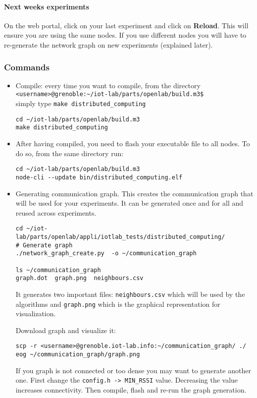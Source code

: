 \documentclass{article}
\begin{document}
\paragraph{Next weeks experiments} On the web portal, click on your last
experiment and click on \textbf{Reload}. This will ensure you are using the
same nodes. If you use different nodes you will have to re-generate the network
graph on new experiments (explained later).

\subsubsection{Commands}

\begin{itemize}

\item Compile: every time you want to compile, from the directory\\
    \verb=<username>@grenoble:~/iot-lab/parts/openlab/build.m3$=\\
    simply type \verb=make distributed_computing=

    \begin{verbatim}cd ~/iot-lab/parts/openlab/build.m3
make distributed_computing\end{verbatim}

\item After having compiled, you need to flash your executable file to all nodes.
    To do so, from the same directory run:
    \begin{verbatim}cd ~/iot-lab/parts/openlab/build.m3
node-cli --update bin/distributed_computing.elf\end{verbatim}

\item Generating communication graph. This creates the communication graph that
    will be used for your experiments. It can be generated once and for all and
    reused across experiments.

    \begin{verbatim}cd ~/iot-lab/parts/openlab/appli/iotlab_tests/distributed_computing/
# Generate graph
./network_graph_create.py  -o ~/communication_graph

ls ~/communication_graph
graph.dot  graph.png  neighbours.csv \end{verbatim}

It generates two important files:
\texttt{neighbours.csv} which will be used by the algorithms and
\texttt{graph.png} which is the graphical representation for visualization.

Download graph and visualize it:
\begin{verbatim}scp -r <username>@grenoble.iot-lab.info:~/communication_graph/ ./
eog ~/communication_graph/graph.png\end{verbatim}

If you graph is not connected or too dense you may want to generate another one.
First change the \verb=config.h -> MIN_RSSI= value. Decreasing the value
increases connectivity. Then compile, flash and re-run the graph generation.


\end{itemize}
\end{document}

